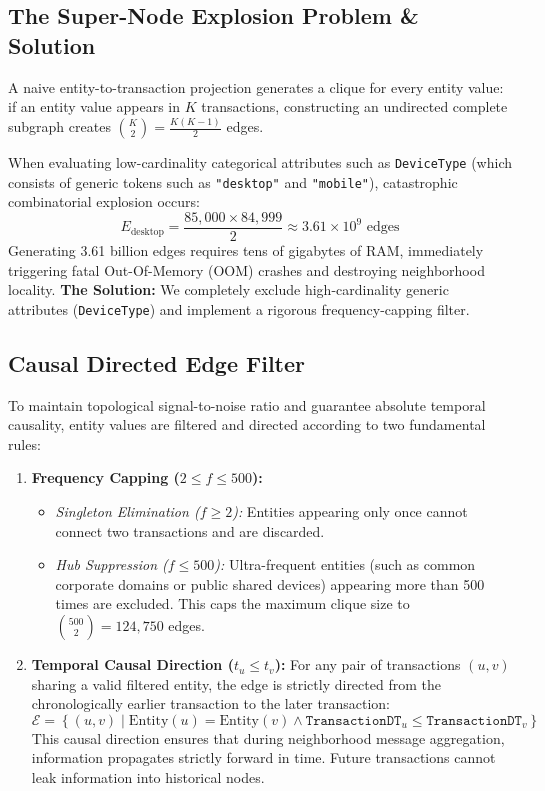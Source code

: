 \documentclass[11pt,a4paper]{report}
\begin{document}
\subsection{The Super-Node Explosion Problem \& Solution}
A naive entity-to-transaction projection generates a clique for every entity value: if an entity value appears in $K$ transactions, constructing an undirected complete subgraph creates $\binom{K}{2} = \frac{K(K-1)}{2}$ edges. 

When evaluating low-cardinality categorical attributes such as \texttt{DeviceType} (which consists of generic tokens such as \texttt{"desktop"} and \texttt{"mobile"}), catastrophic combinatorial explosion occurs:
\begin{equation}
E_{\text{desktop}} = \frac{85{,}000 \times 84{,}999}{2} \approx 3.61 \times 10^9 \text{ edges}
\end{equation}
Generating 3.61 billion edges requires tens of gigabytes of RAM, immediately triggering fatal Out-Of-Memory (OOM) crashes and destroying neighborhood locality.
\textbf{The Solution:} We completely exclude high-cardinality generic attributes (\texttt{DeviceType}) and implement a rigorous frequency-capping filter.

\subsection{Causal Directed Edge Filter}
To maintain topological signal-to-noise ratio and guarantee absolute temporal causality, entity values are filtered and directed according to two fundamental rules:
\begin{enumerate}
    \item \textbf{Frequency Capping ($2 \leq f \leq 500$):}
    \begin{itemize}
        \item \textit{Singleton Elimination ($f \geq 2$):} Entities appearing only once cannot connect two transactions and are discarded.
        \item \textit{Hub Suppression ($f \leq 500$):} Ultra-frequent entities (such as common corporate domains or public shared devices) appearing more than 500 times are excluded. This caps the maximum clique size to $\binom{500}{2} = 124,750$ edges.
    \end{itemize}
    \item \textbf{Temporal Causal Direction ($t_u \leq t_v$):}
    For any pair of transactions $(u, v)$ sharing a valid filtered entity, the edge is strictly directed from the chronologically earlier transaction to the later transaction:
    \begin{equation}
    \mathcal{E} = \left\{ (u, v) \mid \text{Entity}(u) = \text{Entity}(v) \land \texttt{TransactionDT}_u \leq \texttt{TransactionDT}_v \right\}
    \end{equation}
    This causal direction ensures that during neighborhood message aggregation, information propagates strictly forward in time. Future transactions cannot leak information into historical nodes.
\end{enumerate}
\end{document}

